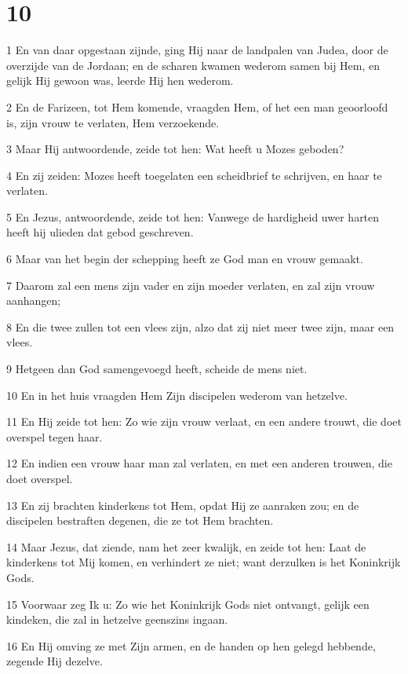 \chapter{10}

\par 1 En van daar opgestaan zijnde, ging Hij naar de landpalen van Judea, door de overzijde van de Jordaan; en de scharen kwamen wederom samen bij Hem, en gelijk Hij gewoon was, leerde Hij hen wederom.
\par 2 En de Farizeen, tot Hem komende, vraagden Hem, of het een man geoorloofd is, zijn vrouw te verlaten, Hem verzoekende.
\par 3 Maar Hij antwoordende, zeide tot hen: Wat heeft u Mozes geboden?
\par 4 En zij zeiden: Mozes heeft toegelaten een scheidbrief te schrijven, en haar te verlaten.
\par 5 En Jezus, antwoordende, zeide tot hen: Vanwege de hardigheid uwer harten heeft hij ulieden dat gebod geschreven.
\par 6 Maar van het begin der schepping heeft ze God man en vrouw gemaakt.
\par 7 Daarom zal een mens zijn vader en zijn moeder verlaten, en zal zijn vrouw aanhangen;
\par 8 En die twee zullen tot een vlees zijn, alzo dat zij niet meer twee zijn, maar een vlees.
\par 9 Hetgeen dan God samengevoegd heeft, scheide de mens niet.
\par 10 En in het huis vraagden Hem Zijn discipelen wederom van hetzelve.
\par 11 En Hij zeide tot hen: Zo wie zijn vrouw verlaat, en een andere trouwt, die doet overspel tegen haar.
\par 12 En indien een vrouw haar man zal verlaten, en met een anderen trouwen, die doet overspel.
\par 13 En zij brachten kinderkens tot Hem, opdat Hij ze aanraken zou; en de discipelen bestraften degenen, die ze tot Hem brachten.
\par 14 Maar Jezus, dat ziende, nam het zeer kwalijk, en zeide tot hen: Laat de kinderkens tot Mij komen, en verhindert ze niet; want derzulken is het Koninkrijk Gods.
\par 15 Voorwaar zeg Ik u: Zo wie het Koninkrijk Gods niet ontvangt, gelijk een kindeken, die zal in hetzelve geenszins ingaan.
\par 16 En Hij omving ze met Zijn armen, en de handen op hen gelegd hebbende, zegende Hij dezelve.
